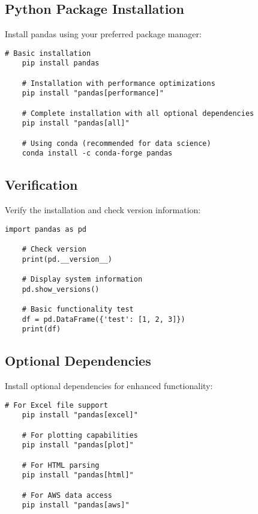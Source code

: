 \subsection{Python Package Installation}
\label{subsec:python_install}

Install pandas using your preferred package manager:

\begin{lstlisting}[style=bashstyle, caption={Pandas Installation}]
	# Basic installation
	pip install pandas
	
	# Installation with performance optimizations
	pip install "pandas[performance]"
	
	# Complete installation with all optional dependencies
	pip install "pandas[all]"
	
	# Using conda (recommended for data science)
	conda install -c conda-forge pandas
\end{lstlisting}

\subsection{Verification}
\label{subsec:verification}

Verify the installation and check version information:

\begin{lstlisting}[language=MyPython, caption={Pandas Verification}]
	import pandas as pd
	
	# Check version
	print(pd.__version__)
	
	# Display system information
	pd.show_versions()
	
	# Basic functionality test
	df = pd.DataFrame({'test': [1, 2, 3]})
	print(df)
\end{lstlisting}

\subsection{Optional Dependencies}

Install optional dependencies for enhanced functionality:

\begin{lstlisting}[style=bashstyle, caption={Optional Dependencies}]
	# For Excel file support
	pip install "pandas[excel]"
	
	# For plotting capabilities
	pip install "pandas[plot]"
	
	# For HTML parsing
	pip install "pandas[html]"
	
	# For AWS data access
	pip install "pandas[aws]"
\end{lstlisting}

